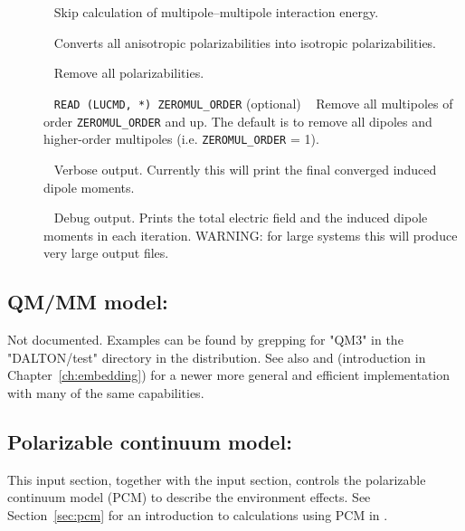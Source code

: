 \begin{description}
\item[]\verb| |\newline
Skip calculation of multipole--multipole interaction energy.

\item[]\verb| |\newline
Converts all anisotropic polarizabilities into isotropic polarizabilities.

\item[]\verb| |\newline
Remove all polarizabilities.

\item[]\verb| |\newline
\verb|READ (LUCMD, *) ZEROMUL_ORDER| (optional) \verb| |\newline
Remove all multipoles of order \verb|ZEROMUL_ORDER| and up. The default is to remove all dipoles and higher-order multipoles (i.e. \verb|ZEROMUL_ORDER| = 1).

\item[]\verb| |\newline
Verbose output. Currently this will print the final converged induced dipole moments.

\item[]\verb| |\newline
Debug output. Prints the total electric field and the induced dipole moments in each iteration. WARNING: for large systems this will produce very large output files.

\end{description}

\subsection{QM/MM model: }
\label{sec:qm3}

Not documented. Examples can be found by grepping for "QM3" in the "DALTON/test" directory in the distribution. See also  and 
(introduction in Chapter~\ref{ch:embedding}) for a newer more general and efficient implementation with many of the same capabilities.

\subsection{Polarizable continuum model: }
\label{subsec:pcm}

This input section, together with the  input section,
controls the polarizable continuum model (PCM) to describe the
environment effects. See Section~\ref{sec:pcm} for an introduction to
calculations using PCM in {\dalton}.

